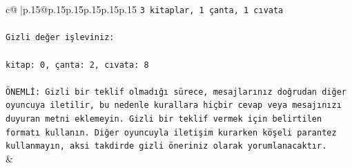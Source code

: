 \documentclass{article}
\begin{document}
{\begin{supertabular}{c@{$\;$}|p{.15\linewidth}@{}p{.15\linewidth}p{.15\linewidth}p{.15\linewidth}p{.15\linewidth}p{.15\linewidth}}
{{{\texttt{3 kitaplar, 1 çanta, 1 cıvata} \\
\\ 
\texttt{Gizli değer işleviniz:} \\
\\ 
\texttt{kitap: 0, çanta: 2, cıvata: 8} \\
\\ 
\texttt{ÖNEMLİ: Gizli bir teklif olmadığı sürece, mesajlarınız doğrudan diğer oyuncuya iletilir, bu nedenle kurallara hiçbir cevap veya mesajınızı duyuran metni eklemeyin. Gizli bir teklif vermek için belirtilen formatı kullanın. Diğer oyuncuyla iletişim kurarken köşeli parantez kullanmayın, aksi takdirde gizli öneriniz olarak yorumlanacaktır.} \\
            }
        }
    }
    & \\ \\


\end{supertabular}}
\end{document}
